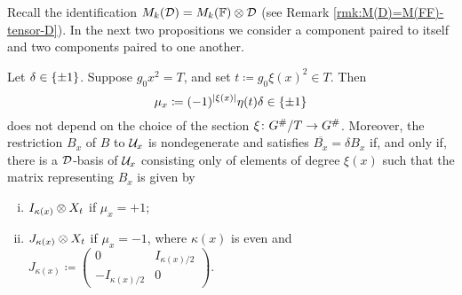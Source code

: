 Recall the identification $M_k (\mathcal{D}) = M_k(\mathbb{F}) \otimes \mathcal{D}$ (see Remark \ref{rmk:M(D)=M(FF)-tensor-D}). 
In the next two propositions we consider a component paired to itself and two components paired to one another.


\begin{prop}\label{prop:self-dual-components}
    Let $\delta \in \{ \pm 1 \}$. 
    Suppose $g_0 x^2 = T$,  and  set $t \coloneqq g_0\xi(x)^2 \in T$. 
    Then 
    \begin{equation}\label{eq:mu_x}
        \mu_{x} \coloneqq (-1)^{|\xi(x)|} \eta(t) \delta \in \{ \pm 1 \}
    \end{equation}
    does not depend on the choice of the section $\xi\colon G^\#/T \to G^\#$. 
    Moreover, the restriction $B_x$ of $B$ to $\mathcal U_x$ is nondegenerate and satisfies $\overline{B_x} = \delta B_x$ if, and only if, there is a $\mathcal{D}$-basis of $\mathcal U_{x}$ consisting only of elements of degree $\xi(x)$ such that the matrix representing $B_x$ is given by
    \begin{enumerate}[(i)]
        \item $I_{\kappa(x)} \otimes X_t$ if $\mu_x = +1$;
        \item $J_{\kappa(x)} \otimes X_t$ if $\mu_{x} = -1$, where $\kappa (x)$ is even and $J_{\kappa(x)} \coloneqq \begin{pmatrix}
        0 & I_{\kappa(x)/2}\\
        -I_{\kappa(x)/2} & 0
    \end{pmatrix}$.
    \end{enumerate}
\end{prop}

